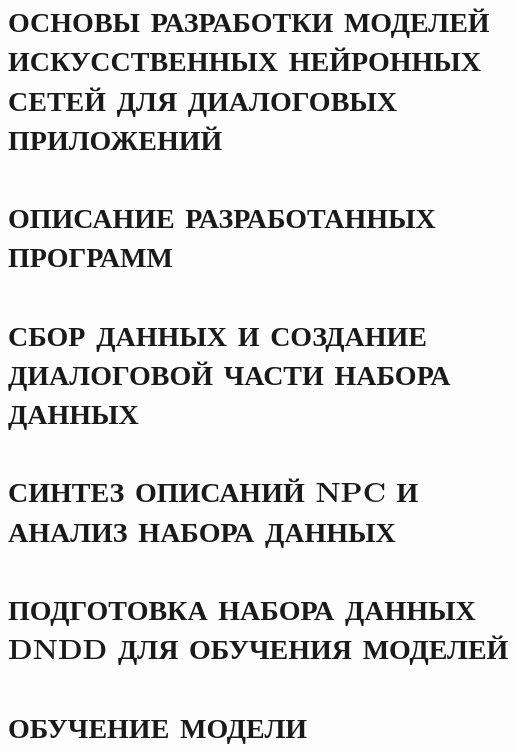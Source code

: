 \documentclass{thesis}
\begin{document}

\tableofcontents                          %
\thispagestyle{empty}


\chapter{ОСНОВЫ РАЗРАБОТКИ МОДЕЛЕЙ ИСКУССТВЕННЫХ НЕЙРОННЫХ СЕТЕЙ ДЛЯ ДИАЛОГОВЫХ ПРИЛОЖЕНИЙ}


\chapter{ОПИСАНИЕ РАЗРАБОТАННЫХ ПРОГРАММ}


\chapter{СБОР ДАННЫХ И СОЗДАНИЕ ДИАЛОГОВОЙ ЧАСТИ НАБОРА ДАННЫХ}


\chapter{СИНТЕЗ ОПИСАНИЙ NPC И АНАЛИЗ НАБОРА ДАННЫХ}


\chapter{ПОДГОТОВКА НАБОРА ДАННЫХ DNDD ДЛЯ ОБУЧЕНИЯ МОДЕЛЕЙ}


\chapter{ОБУЧЕНИЕ МОДЕЛИ}



\break



\appendix

\end{document}
